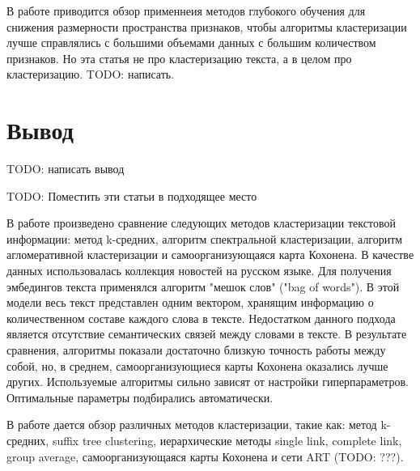 В работе \cite{deep-clustering-survey} приводится обзор применнеия методов глубокого обучения для снижения размерности пространства признаков, чтобы алгоритмы кластеризации лучше справлялись с большими объемами данных с большим количеством признаков. Но эта статья не про кластеризацию текста, а в целом про кластеризацию. TODO: написать.

\section{Вывод}
TODO: написать вывод

TODO: Поместить эти статьи в подходящее место

В работе \cite{compare-text-clustering-sokolov} произведено сравнение следующих методов кластеризации текстовой информации: метод k-средних, алгоритм спектральной кластеризации, алгоритм агломеративной кластеризации и самоорганизующаяся карта Кохонена. В качестве данных использовалась коллекция новостей на русском языке. Для получения эмбедингов текста применялся алгоритм "мешок слов" ("bag of words"). В этой модели весь текст представлен одним вектором, хранящим информацию о количественном составе каждого слова в тексте. Недостатком данного подхода является отсутствие семантических связей между словами в тексте. В результате сравнения, алгоритмы показали достаточно близкую точность работы между собой, но, в среднем, самоорганизующиеся карты Кохонена оказались лучше других. Используемые алгоритмы сильно зависят от настройки гиперпараметров. Оптимальные параметры подбирались автоматически.

В работе \cite{method-text-clustering-andreev} дается обзор различных методов кластеризации, такие как: метод k-средних, suffix tree clustering, иерархические методы single link, complete link, group average, самоорганизующаяся карты Кохонена и сети ART (TODO: ???).
